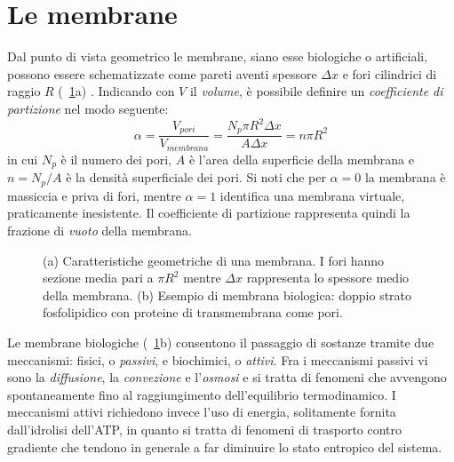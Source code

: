 \section{Le membrane}
Dal punto di vista geometrico le membrane, siano esse biologiche o artificiali, possono essere schematizzate come pareti aventi spessore $\Delta x$ e fori cilindrici di raggio $R$ (\figurename~\ref{membrana}a) . Indicando con $V$ il \textit{volume}, è possibile definire un \textit{coefficiente di partizione} nel modo seguente:
\begin{equation}\label{coe_alpha}
	\alpha = \frac{V_{pori}}{V_{membrana}}= \frac{N_p \pi R^2 \Delta x}{A \Delta x} = n \pi R^2
\end{equation}
in cui $N_p$ è il numero dei pori, $A$ è l'area della superficie della membrana e $n=N_p/A$ è la densità superficiale dei pori. Si noti che per $\alpha=0$ la membrana è massiccia e priva di fori, mentre $\alpha=1$ identifica una membrana virtuale, praticamente inesistente. Il coefficiente di partizione rappresenta quindi la frazione di \textit{vuoto} della membrana.
\begin{figure}[htb]
	\centering
	\qquad
		\caption{(a) Caratteristiche geometriche di una membrana. I fori hanno sezione media pari a $\pi R^2$ mentre $\Delta x$ rappresenta lo spessore medio della membrana. (b) Esempio di membrana biologica: doppio strato fosfolipidico con proteine di transmembrana come pori.}\label{membrana}
\end{figure}

Le membrane biologiche (\figurename~\ref{membrana}b) consentono il passaggio di sostanze tramite due meccanismi: fisici, o \textit{passivi}, e biochimici, o \textit{attivi}. Fra i meccanismi passivi vi sono la \textit{diffusione}, la \textit{convezione} e l'\textit{osmosi} e si tratta di fenomeni che avvengono spontaneamente fino al raggiungimento dell'equilibrio termodinamico. I meccanismi attivi richiedono invece l'uso di energia, solitamente fornita dall'idrolisi dell'ATP, in quanto si tratta di fenomeni di trasporto contro gradiente che tendono in generale a far diminuire lo stato entropico del sistema.
